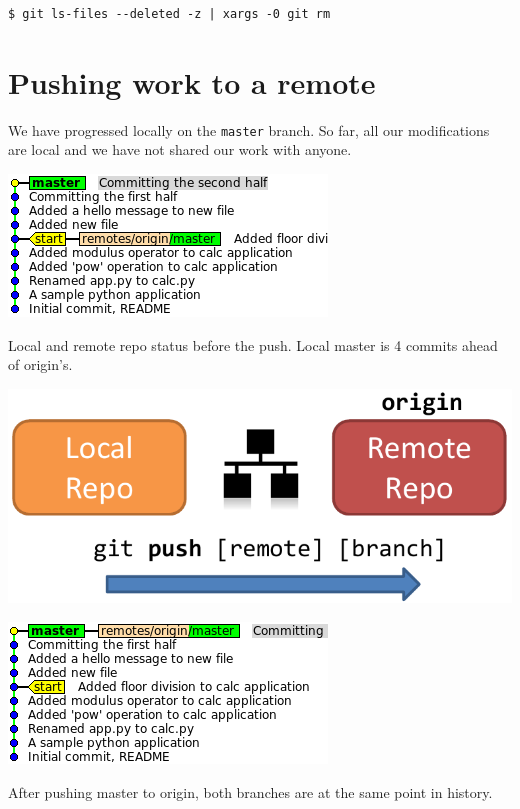 \documentclass[a4paper]{../../common/tufte-latex/tufte-handout}
\begin{document}
\begin{lstlisting}[style=BashInputStyle]
  $ git ls-files --deleted -z | xargs -0 git rm
\end{lstlisting}

\section{Pushing work to a remote}

We have progressed locally on the \texttt{master} branch.
So far, all our modifications are local and we have not shared our work with anyone.

\begin{marginfigure}%
  \centering
  \includegraphics[width=\linewidth]{gitcommit-pre-push.png}
  \label{fig:gitcommit-pre-push}
  \caption{Local and remote repo status before the push. Local master is 4 commits ahead of origin's.}
\end{marginfigure}
\begin{marginfigure}%
  \centering
  \includegraphics[width=\linewidth]{gitpush-schema.pdf}
  \label{fig:gitpush-schema}
\end{marginfigure}
\begin{marginfigure}%
  \centering
  \includegraphics[width=\linewidth]{gitcommit-post-push.png}
  \label{fig:gitcommit-post-push}
  \caption{After pushing master to origin, both branches are at the same point in history.}
\end{marginfigure}
\end{document}
